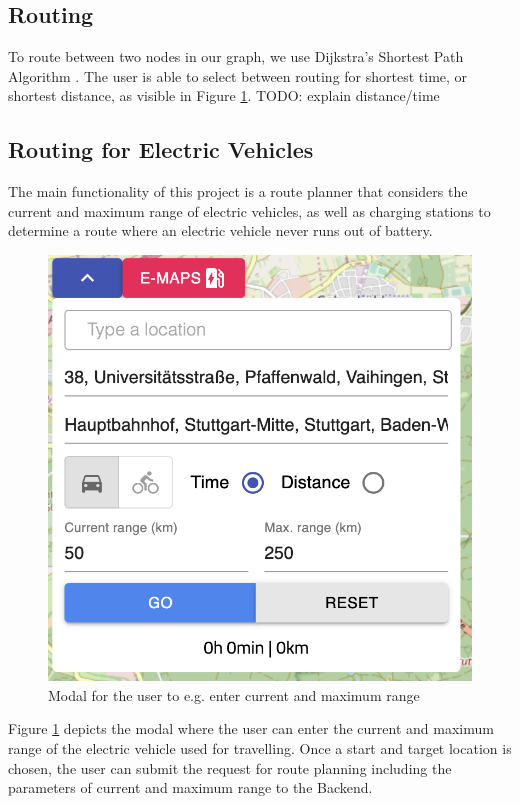 \documentclass[a4paper]{article}
\begin{document}
\subsection{Routing}
To route between two nodes in our graph, we use Dijkstra's Shortest Path Algorithm \cite{Dijkstra1959}.
The user is able to select between routing for shortest time, or shortest distance, as visible in Figure \ref{fig:input}.
TODO: explain distance/time
\subsection{Routing for Electric Vehicles}
The main functionality of this project is a route planner that considers the current and maximum range of electric vehicles, as well as charging stations to determine a route where an electric vehicle never runs out of battery.
\begin{figure}[h]
    \centering
    \includegraphics[scale=0.3]{figures/input}
    \caption{Modal for the user to e.g. enter current and maximum range}
    \label{fig:input}
\end{figure}
Figure \ref{fig:input} depicts the modal where the user can enter the current and maximum range of the electric vehicle used for travelling.
Once a start and target location is chosen, the user can submit the request for route planning including the parameters of current and maximum range to the Backend.
\end{document}
